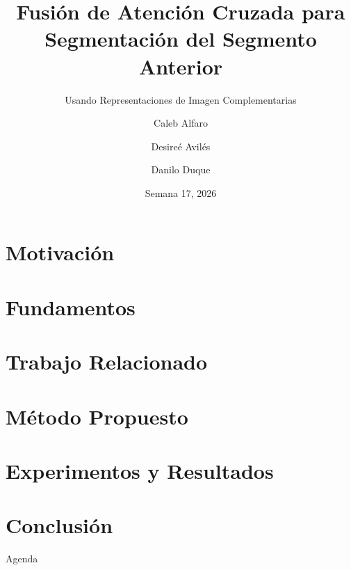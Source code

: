 \documentclass[aspectratio=169]{beamer}
\title{Fusión de Atención Cruzada para Segmentación del Segmento Anterior}
\subtitle{Usando Representaciones de Imagen Complementarias}
\author[Alfaro · Avilés · Duque]{Caleb Alfaro \and Desireé Avilés \and Danilo Duque}
\institute{Instituto Tecnológico de Costa Rica}
\date{Semana 17, 2026}
\begin{document}
\section{Motivación}
\section{Fundamentos}
\section{Trabajo Relacionado}
\section{Método Propuesto}
\section{Experimentos y Resultados}
\section{Conclusión}

\begin{frame}
\titlepage
\end{frame}

\begin{frame}{Agenda}
\tableofcontents
\end{frame}

\end{document}
